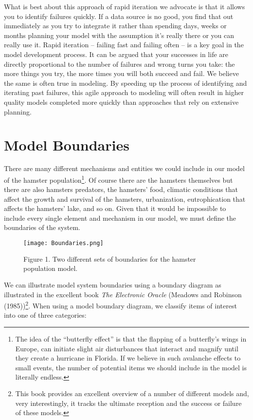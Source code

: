 \documentclass[]{memoir}
\makeatletter
\def\maxwidth{\ifdim\Gin@nat@width>\linewidth\linewidth
\else\Gin@nat@width\fi}
\let\Oldincludegraphics\includegraphics
\renewcommand{\includegraphics}[1]{\Oldincludegraphics[width=\maxwidth]{#1}}
\makeatother
\begin{document}
What is best about this approach of rapid iteration we advocate is that
it allows you to identify failures quickly. If a data source is no good,
you find that out immediately as you try to integrate it rather than
spending days, weeks or months planning your model with the assumption
it's really there or you can really use it. Rapid iteration -- failing
fast and failing often -- is a key goal in the model development
process. It can be argued that your successes in life are directly
proportional to the number of failures and wrong turns you take: the
more things you try, the more times you will both succeed and fail. We
believe the same is often true in modeling. By speeding up the process
of identifying and iterating past failures, this agile approach to
modeling will often result in higher quality models completed more
quickly than approaches that rely on extensive planning.

\section{Model Boundaries}

There are many different mechanisms and entities we could include in our
model of the hamster population\footnote{The idea of the ``butterfly
  effect'' is that the flapping of a butterfly's wings in Europe, can
  initiate slight air disturbances that interact and magnify until they
  create a hurricane in Florida. If we believe in such avalanche effects
  to small events, the number of potential items we should include in
  the model is literally endless.}. Of course there are the hamsters
themselves but there are also hamsters predators, the hamsters' food,
climatic conditions that affect the growth and survival of the hamsters,
urbanization, eutrophication that affects the hamsters' lake, and so on.
Given that it would be impossible to include every single element and
mechanism in our model, we must define the boundaries of the system.

\begin{figure}[htbp]
\centering
\texttt{[image: Boundaries.png]}
\caption{Figure 1. Two different sets of boundaries for the hamster
population model.}
\end{figure}

We can illustrate model system boundaries using a boundary diagram as
illustrated in the excellent book \emph{The Electronic Oracle} (Meadows
and Robinson (1985))\footnote{This book provides an excellent overview
  of a number of different models and, very interestingly, it tracks the
  ultimate reception and the success or failure of these models.}. When
using a model boundary diagram, we classify items of interest into one
of three categories:
\end{document}
